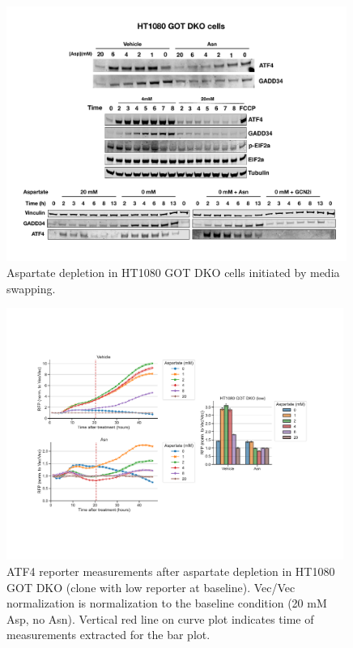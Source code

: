\begin{figure}[t]
    \centering
    \includegraphics[width=0.99\textwidth]{figures/sapp/ISR/HT1080_DKO_ISR.pdf}
    \caption[Asp depl. induced ISR, HT1080 western.]{
    Aspartate depletion in HT1080 GOT DKO cells initiated by media swapping.
    }
    \label{fig:sapp:ISR:HT1080_DKO_ISR}
\end{figure}

\begin{figure}[t]
    \centering
    \includegraphics[width=0.98\textwidth]{figures/sapp/ISR/HT1080_DKO_ASPtit_time.pdf}
    \caption[Asp depl. induced ISR, HT1080 ATF4 reporter.]{
    ATF4 reporter measurements after aspartate depletion in HT1080 GOT DKO (clone with low reporter at baseline).
    Vec/Vec normalization is normalization to the baseline condition (20 mM Asp, no Asn).
    Vertical red line on curve plot indicates time of measurements extracted for the bar plot.
    }
    \label{fig:sapp:ISR:HT1080_DKO_ASPtit_time}
\end{figure}

